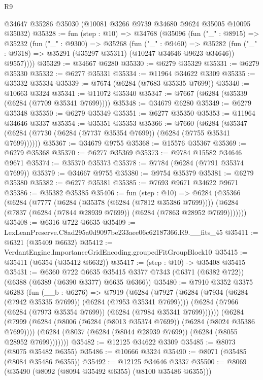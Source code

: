 \begin{lexlean}{R9}
\begin{coremodule}
    @34647
    @35286
    @35030
    (@10081 @3266 @9739 @34680 @9624 @35005 @10095 @35032)
@35328 := fun (step : @10) =>
  @34768
    (@35096
      (fun ("_" : @8915) =>
      @35232
        (fun ("_" : @9300) =>
        @35268
          (fun ("_" : @9460) =>
          @35282
            (fun ("_" : @9318) => @35291 (@35297 @35311) (@10247 @34646 @9623 @34646))
            @9557))))
@35329 := @34667 @6280
@35330 := @6279 @35329
@35331 := @6279 @35330
@35332 := @6277 @35331
@35334 := @11964 @34622 @3309
@35335 := @35332 @35334
@35339 := @7674 (@6284 (@7683 @35335 @7699))
@35340 := @10663 @3324
@35341 := @11072 @35340
@35347 := @7667 (@6284 (@35339 (@6284 (@7709 @35341 @7699))))
@35348 := @34679 @6280
@35349 := @6279 @35348
@35350 := @6279 @35349
@35351 := @6277 @35350
@35353 := @11964 @34646 @3337
@35354 := @35351 @35353
@35366 := @7660
    (@6284 (@35347 (@6284 (@7730 (@6284 (@7737 @35354 @7699)) (@6284 (@7755 @35341 @7699))))))
@35367 := @34679 @9755
@35368 := @15576 @35367
@35369 := @6279 @35368
@35370 := @6277 @35369
@35373 := @9784 @15582 @34646 @9671
@35374 := @35370 @35373
@35378 := @7784 (@6284 (@7791 @35374 @7699))
@35379 := @34667 @9755
@35380 := @9754 @35379
@35381 := @6279 @35380
@35382 := @6277 @35381
@35385 := @7693 @9671 @34622 @9671
@35386 := @35382 @35385
@35406 := fun (step : @10) =>
  @6284
    (@35366
      (@6284
        (@7777
          (@6284 (@35378 (@6284 (@7812 @35386 @7699))))
          (@6284 (@7837 (@6284 (@7844 @28939 @7699)) (@6284 (@7863 @28952 @7699)))))))
@35408 := @6316 @722 @6635
@35409 := LexLeanPreserve.C8ad295a0d9097be233aee06c62187366.R9.__fits_45
@35411 := @6321 (@35409 @6632)
@35412 := VerdantEngine.ImportanceGridEncoding.groupedFitGroupBlock10
@35415 := @35411 (@6354 (@35412 @6632))
@35417 := (step : @10) -> @35408 @35415
@35431 := @6360
    @722
    @6635
    @35415
    @3377
    @7343
    (@6371 (@6382 @722))
    (@6388 (@6389 (@6390 @3377) @6635 @6366))
@35480 := @7910
    @3352
    @3375
    @6283
    (fun (__b : @6276) =>
    @7919
      (@6284
        (@7927
          (@6284 (@7934 (@6284 (@7942 @35335 @7699)) (@6284 (@7953 @35341 @7699))))
          (@6284 (@7966 (@6284 (@7973 @35354 @7699)) (@6284 (@7984 @35341 @7699))))))
      (@6284
        (@7999
          (@6284 (@8006 (@6284 (@8013 @35374 @7699)) (@6284 (@8024 @35386 @7699))))
          (@6284 (@8037 (@6284 (@8044 @28939 @7699)) (@6284 (@8055 @28952 @7699)))))))
@35482 := @12125 @34622 @3309
@35485 := @8073 (@8075 @35482 @6355)
@35486 := @10666 @3324
@35490 := @8071 (@35485 (@8084 @35486 @6355))
@35492 := @12125 @34646 @3337
@35500 := @8069 (@35490 (@8092 (@8094 @35492 @6355) (@8100 @35486 @6355)))

\end{coremodule}
\end{lexlean}
